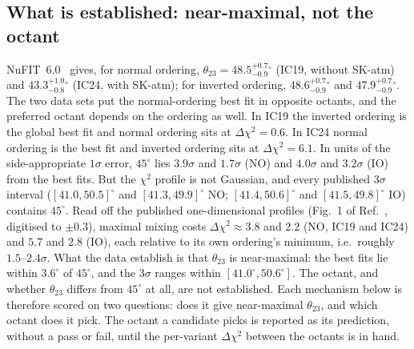 \subsection{What is established: near-maximal, not the octant}\label{sec:octant}
NuFIT~6.0~\cite{nufit6} gives, for normal ordering, $\theta_{23}=48.5^{+0.7}_{-0.9}{}^\circ$ (IC19,
without SK-atm) and $43.3^{+1.0}_{-0.8}{}^\circ$ (IC24, with SK-atm); for inverted ordering,
$48.6^{+0.7}_{-0.9}{}^\circ$ and $47.9^{+0.7}_{-0.9}{}^\circ$. The two data sets put the
normal-ordering best fit in opposite octants, and the preferred octant depends on the ordering as
well. In IC19 the inverted ordering is the global best fit and normal ordering sits at
$\Delta\chi^2=0.6$. In IC24 normal ordering is the best fit and inverted ordering sits at
$\Delta\chi^2=6.1$. In units of the side-appropriate $1\sigma$ error,
$45^\circ$ lies $3.9\sigma$ and $1.7\sigma$ (NO) and $4.0\sigma$ and $3.2\sigma$ (IO) from the best
fits. But the $\chi^2$ profile is not Gaussian, and every published $3\sigma$ interval
($[41.0,50.5]^\circ$ and $[41.3,49.9]^\circ$ NO; $[41.4,50.6]^\circ$ and $[41.5,49.8]^\circ$ IO)
contains $45^\circ$. Read off the published one-dimensional profiles (Fig.~1 of
Ref.~\cite{nufit6}, digitised to $\pm0.3$), maximal mixing costs $\Delta\chi^2\approx3.8$ and $2.2$
(NO, IC19 and IC24) and $5.7$ and $2.8$ (IO), each relative to its own ordering's minimum, i.e.\
roughly $1.5$--$2.4\sigma$. What the data establish is that $\theta_{23}$ is near-maximal: the best fits lie
within $3.6^\circ$ of $45^\circ$, and the $3\sigma$ ranges within $[41.0^\circ,50.6^\circ]$. The octant,
and whether $\theta_{23}$ differs from $45^\circ$ at all, are not established. Each mechanism below
is therefore scored on two questions: does it give near-maximal $\theta_{23}$, and which octant does
it pick. The octant a candidate picks is reported as its prediction, without a pass or fail, until
the per-variant $\Delta\chi^2$ between the octants is in hand.

